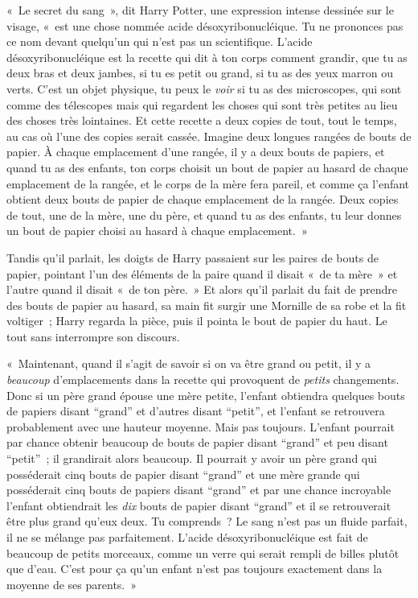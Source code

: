 «~Le secret du sang~», dit Harry Potter, une expression intense dessinée sur le visage, «~est une chose nommée acide désoxyribonucléique. Tu ne prononces pas ce nom devant quelqu'un qui n'est pas un scientifique. L'acide désoxyribonucléique est la recette qui dit à ton corps comment grandir, que tu as deux bras et deux jambes, si tu es petit ou grand, si tu as des yeux marron ou verts. C'est un objet physique, tu peux le \emph{voir} si tu as des microscopes, qui sont comme des télescopes mais qui regardent les choses qui sont très petites au lieu des choses très lointaines. Et cette recette a deux copies de tout, tout le temps, au cas où l'une des copies serait cassée. Imagine deux longues rangées de bouts de papier. À chaque emplacement d'une rangée, il y a deux bouts de papiers, et quand tu as des enfants, ton corps choisit un bout de papier au hasard de chaque emplacement de la rangée, et le corps de la mère fera pareil, et comme ça l'enfant obtient deux bouts de papier de chaque emplacement de la rangée. Deux copies de tout, une de la mère, une du père, et quand tu as des enfants, tu leur donnes un bout de papier choisi au hasard à chaque emplacement.~»

Tandis qu'il parlait, les doigts de Harry passaient sur les paires de bouts de papier, pointant l'un des éléments de la paire quand il disait «~de ta mère~» et l'autre quand il disait «~de ton père.~» Et alors qu'il parlait du fait de prendre des bouts de papier au hasard, sa main fit surgir une Mornille de sa robe et la fit voltiger~; Harry regarda la pièce, puis il pointa le bout de papier du haut. Le tout sans interrompre son discours.

«~Maintenant, quand il s'agit de savoir si on va être grand ou petit, il y a \emph{beaucoup} d'emplacements dans la recette qui provoquent de \emph{petits} changements. Donc si un père grand épouse une mère petite, l'enfant obtiendra quelques bouts de papiers disant “grand” et d'autres disant “petit”, et l'enfant se retrouvera probablement avec une hauteur moyenne. Mais pas toujours. L'enfant pourrait par chance obtenir beaucoup de bouts de papier disant “grand” et peu disant “petit”~; il grandirait alors beaucoup. Il pourrait y avoir un père grand qui posséderait cinq bouts de papier disant “grand” et une mère grande qui posséderait cinq bouts de papiers disant “grand” et par une chance incroyable l'enfant obtiendrait les \emph{dix} bouts de papier disant “grand” et il se retrouverait être plus grand qu'eux deux. Tu comprends~? Le sang n'est pas un fluide parfait, il ne se mélange pas parfaitement. L'acide désoxyribonucléique est fait de beaucoup de petits morceaux, comme un verre qui serait rempli de billes plutôt que d'eau. C'est pour ça qu'un enfant n'est pas toujours exactement dans la moyenne de ses parents.~»

